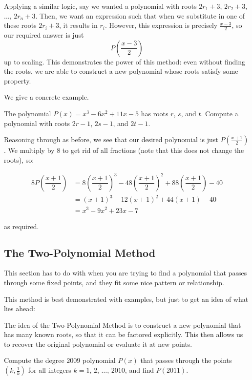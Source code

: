 \documentclass[11pt]{scrartcl}
\begin{document}
Applying a similar logic, say we wanted a polynomial with roots $2r_1+3$, $2r_2+3$, $\dots$, $2r_n+3$. Then, we want an expression such that when we substitute in one of these roots $2r_i+3$, it results in $r_i$. However, this expression is precisely $\tfrac{x-3}{2}$, so our required answer is just \[P\left(\dfrac{x-3}{2}\right)\] up to scaling. This demonstrates the power of this method: even without finding the roots, we are able to construct a new polynomial whose roots satisfy some property.

We give a concrete example.

\begin{example*}
The polynomial $P(x) = x^3-6x^2+11x-5$ has roots $r$, $s$, and $t$. Compute a polynomial with roots $2r-1$, $2s-1$, and $2t-1$.
\end{example*}

Reasoning through as before, we see that our desired polynomial is just $P\left(\tfrac{x+1}{2}\right)$. We multiply by $8$ to get rid of all fractions (note that this does not change the roots), so:

\begin{align*}
8P\left(\dfrac{x+1}{2}\right) &= 8\left(\dfrac{x+1}{2}\right)^3-48\left(\dfrac{x+1}{2}\right)^2+88\left(\dfrac{x+1}{2}\right)-40 \\
&= (x+1)^3-12(x+1)^2+44(x+1)-40 \\
&= x^3 - 9 x^2 + 23 x - 7
\end{align*}

as required.

\subsection{The Two-Polynomial Method}

This section has to do with when you are trying to find a polynomial that passes through some fixed points, and they fit some nice pattern or relationship.

This method is best demonstrated with examples, but just to get an idea of what lies ahead:

The idea of the Two-Polynomial Method is to construct a new polynomial that has many known roots, so that it can be factored explicitly. This then allows us to recover the original polynomial or evaluate it at new points.

\begin{example*}
Compute the degree $2009$ polynomial $P(x)$ that passes through the points $\left(k, \tfrac{1}{k}\right)$ for all integers $k = 1$, $2$, $\dots$, $2010$, and find $P(2011)$.
\end{example*}
\end{document}
